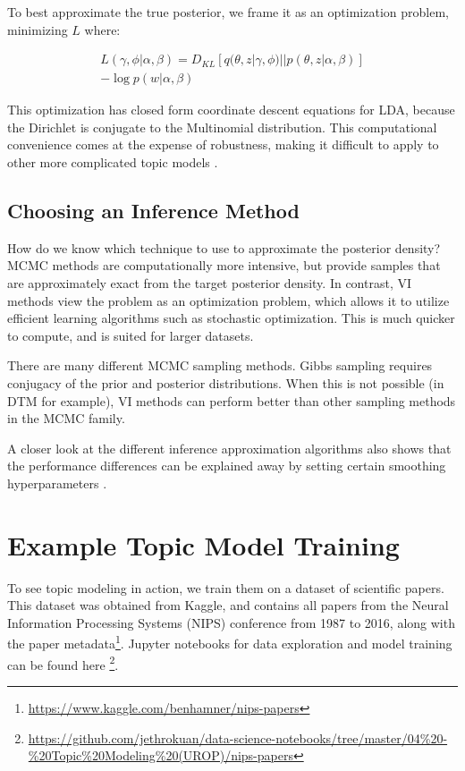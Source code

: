 \documentclass[letterpaper]{article}
\begin{document}
To best approximate the true posterior, we frame it as an optimization
problem, minimizing $L$ where:

\begin{multline}
L(\gamma, \phi | \alpha, \beta) = D_{KL}\left[ q(\theta, z | \gamma,
  \phi) || p(\theta, z | \alpha, \beta) \right] \\
- \log p(w | \alpha, \beta)
\end{multline}

This optimization has closed form coordinate descent equations for
LDA, because the Dirichlet is conjugate to the Multinomial
distribution. This computational convenience comes at the expense of
robustness, making it difficult to apply to other more complicated
topic models \cite{blei2003latent}.

\subsection{Choosing an Inference Method}
\label{sub:choosing-inference}
How do we know which technique to use to approximate the posterior
density? MCMC methods are computationally more intensive, but provide
samples that are approximately exact from the target posterior
density. In contrast, VI methods view the problem as an optimization
problem, which allows it to utilize efficient learning algorithms such
as stochastic optimization. This is much quicker to compute, and is
suited for larger datasets.

There are many different MCMC sampling methods. Gibbs sampling
requires conjugacy of the prior and posterior distributions. When this
is not possible (in DTM for example), VI methods can perform better
than other sampling methods in the MCMC family.

A closer look at the different inference approximation algorithms
also shows that the performance differences can be explained away by
setting certain smoothing hyperparameters
\cite{asuncion-2012-smoot-infer}.

\section{Example Topic Model Training}
To see topic modeling in action, we train them on a dataset of
scientific papers. This dataset was obtained from Kaggle, and contains
all papers from the Neural Information Processing Systems (NIPS)
conference from 1987 to 2016, along with the paper
metadata\footnote{\url{https://www.kaggle.com/benhamner/nips-papers}}.
Jupyter notebooks for data exploration and model training can be found
here
\footnote{\url{https://github.com/jethrokuan/data-science-notebooks/tree/master/04\%20-\%20Topic\%20Modeling\%20(UROP)/nips-papers}}.
\end{document}
